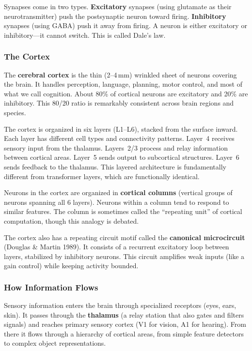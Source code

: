 \documentclass[11pt,a4paper]{article}
\begin{document}
Synapses come in two types. \textbf{Excitatory} synapses (using glutamate as their neurotransmitter) push the postsynaptic neuron toward firing. \textbf{Inhibitory} synapses (using GABA) push it away from firing. A neuron is either excitatory or inhibitory---it cannot switch. This is called Dale's law.

\subsubsection{The Cortex}

The \textbf{cerebral cortex} is the thin (2--4\,mm) wrinkled sheet of neurons covering the brain. It handles perception, language, planning, motor control, and most of what we call cognition. About 80\% of cortical neurons are excitatory and 20\% are inhibitory. This 80/20 ratio is remarkably consistent across brain regions and species.

The cortex is organized in six layers (L1--L6), stacked from the surface inward. Each layer has different cell types and connectivity patterns. Layer~4 receives sensory input from the thalamus. Layers~2/3 process and relay information between cortical areas. Layer~5 sends output to subcortical structures. Layer~6 sends feedback to the thalamus. This layered architecture is fundamentally different from transformer layers, which are functionally identical.

Neurons in the cortex are organized in \textbf{cortical columns} (vertical groups of neurons spanning all 6 layers). Neurons within a column tend to respond to similar features. The column is sometimes called the ``repeating unit'' of cortical computation, though this analogy is debated.

The cortex also has a repeating circuit motif called the \textbf{canonical microcircuit} (Douglas \& Martin 1989). It consists of a recurrent excitatory loop between layers, stabilized by inhibitory neurons. This circuit amplifies weak inputs (like a gain control) while keeping activity bounded.

\subsubsection{How Information Flows}

Sensory information enters the brain through specialized receptors (eyes, ears, skin). It passes through the \textbf{thalamus} (a relay station that also gates and filters signals) and reaches primary sensory cortex (V1 for vision, A1 for hearing). From there it flows through a hierarchy of cortical areas, from simple feature detectors to complex object representations.
\end{document}
